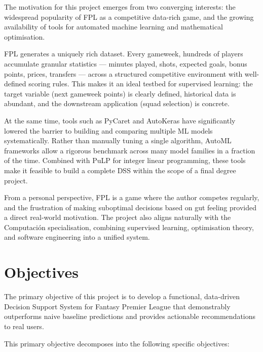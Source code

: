 \documentclass[11pt,english,listoffigures,listoftables]{tfgetsinf}
\begin{document}
The motivation for this project emerges from two converging interests: the widespread popularity of FPL as a competitive data-rich game, and the growing availability of tools for automated machine learning and mathematical optimisation.

FPL generates a uniquely rich dataset. Every gameweek, hundreds of players accumulate granular statistics --- minutes played, shots, expected goals, bonus points, prices, transfers --- across a structured competitive environment with well-defined scoring rules. This makes it an ideal testbed for supervised learning: the target variable (next gameweek points) is clearly defined, historical data is abundant, and the downstream application (squad selection) is concrete.

At the same time, tools such as PyCaret and AutoKeras have significantly lowered the barrier to building and comparing multiple ML models systematically. Rather than manually tuning a single algorithm, AutoML frameworks allow a rigorous benchmark across many model families in a fraction of the time. Combined with PuLP for integer linear programming, these tools make it feasible to build a complete DSS within the scope of a final degree project.

From a personal perspective, FPL is a game where the author competes regularly, and the frustration of making suboptimal decisions based on gut feeling provided a direct real-world motivation. The project also aligns naturally with the Computación specialisation, combining supervised learning, optimisation theory, and software engineering into a unified system.

\section{Objectives}

The primary objective of this project is to develop a functional, data-driven Decision Support System for Fantasy Premier League that demonstrably outperforms naive baseline predictions and provides actionable recommendations to real users.

This primary objective decomposes into the following specific objectives:
\end{document}
